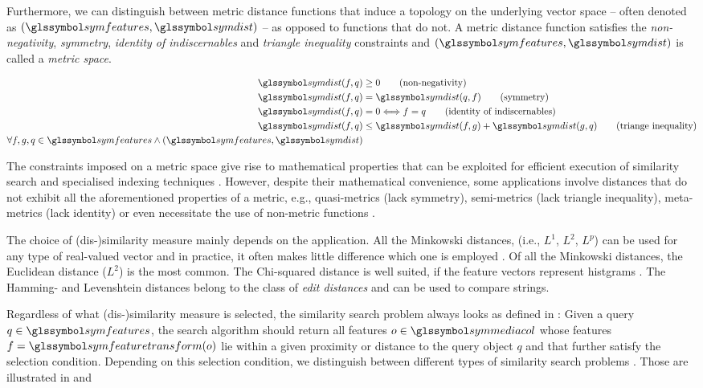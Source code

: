 Furthermore, we can distinguish between metric distance functions that induce a topology on the underlying vector space -- often denoted as $(\symfeatures, \symdist)$ -- as opposed to functions that do not. A metric distance function satisfies the \emph{non-negativity}, \emph{symmetry}, \emph{identity of indiscernables} and \emph{triangle inequality} constraints and $(\symfeatures, \symdist)$ is called a \emph{metric space}. 

\begin{align}
  \label{eq:metric}
   \symdist(f,q) &\geq 0                           \tag{non-negativity} \\
   \symdist(f,q) &= \symdist(q,f)                    \tag{symmetry}\\
   \symdist(f,q) &= 0 \Longleftrightarrow f = q    \tag{identity of indiscernables}\\
   \symdist(f,q) &\leq  \symdist(f,g) +  \symdist(g,q)   \tag{triange inequality}\\
   \forall f,g,q \in \symfeatures \wedge (\symfeatures, \symdist) \nonumber
\end{align}

The constraints imposed on a metric space give rise to mathematical properties that can be exploited for efficient execution of similarity search and specialised indexing techniques \cite{Zezula:2006Similarity}. However, despite their mathematical convenience, some applications involve distances that do not exhibit all the aforementioned properties of a metric, e.g., quasi-metrics (lack symmetry), semi-metrics (lack triangle inequality), meta-metrics (lack identity) \cite{Zezula:2006Similarity} or even necessitate the use of non-metric functions \cite{Skopal:2011Nonmetric}.

The choice of (dis-)similarity measure mainly depends on the application. All the Minkowski distances, (i.e., $L^1$, $L^2$, $L^p$) can be used for any type of real-valued vector and in practice, it often makes little difference which one is employed \cite{Rossetto:2018thesis}. Of all the Minkowski distances, the Euclidean distance ($L^2$) is the most common. The Chi-squared distance is well suited, if the feature vectors represent histgrams \cite{Pele:2010Quadratic}. The Hamming- and Levenshtein distances belong to the class of \emph{edit distances} and can be used to compare strings.

Regardless of what (dis-)similarity measure is selected, the similarity search problem always looks as defined in : Given a query $q \in \symfeatures$, the search algorithm should return all features $o \in \symmediacol$ whose features $f = \symfeaturetransform(o)$ lie within a given proximity or distance to the query object $q$ and that further satisfy the selection condition. Depending on this selection condition, we distinguish between different types of similarity search problems \cite{Zezula:2006Similarity}. Those are illustrated in  and 


